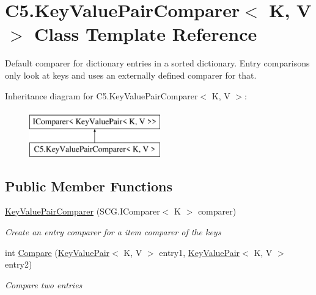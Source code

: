 \hypertarget{class_c5_1_1_key_value_pair_comparer}{}\section{C5.\+Key\+Value\+Pair\+Comparer$<$ K, V $>$ Class Template Reference}
\label{class_c5_1_1_key_value_pair_comparer}


Default comparer for dictionary entries in a sorted dictionary. Entry comparisons only look at keys and uses an externally defined comparer for that.  


Inheritance diagram for C5.\+Key\+Value\+Pair\+Comparer$<$ K, V $>$\+:\begin{figure}[H]
\begin{center}
\leavevmode
\includegraphics[height=2.000000cm]{class_c5_1_1_key_value_pair_comparer}
\end{center}
\end{figure}
\subsection*{Public Member Functions}
\begin{DoxyCompactItemize}
\item 
\hyperlink{class_c5_1_1_key_value_pair_comparer_a995d4966385b04e603364b50cc1b1a82}{Key\+Value\+Pair\+Comparer} (S\+C\+G.\+I\+Comparer$<$ K $>$ comparer)
\begin{DoxyCompactList}\small\item\em Create an entry comparer for a item comparer of the keys \end{DoxyCompactList}\item 
int \hyperlink{class_c5_1_1_key_value_pair_comparer_aad76f35d5b5eb2df2375890a20a62747}{Compare} (\hyperlink{struct_c5_1_1_key_value_pair}{Key\+Value\+Pair}$<$ K, V $>$ entry1, \hyperlink{struct_c5_1_1_key_value_pair}{Key\+Value\+Pair}$<$ K, V $>$ entry2)
\begin{DoxyCompactList}\small\item\em Compare two entries \end{DoxyCompactList}\end{DoxyCompactItemize}


